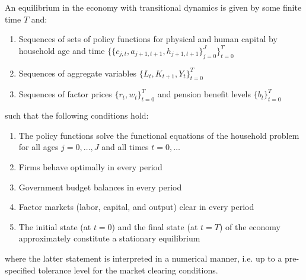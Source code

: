 An equilibrium in the economy with transitional dynamics is given by some finite time $T$ and:
\begin{enumerate}
    \item Sequences of sets of policy functions for physical and human capital by household age and time $\{ \{c_{j, t}, a_{j+1, t+1}, h_{j+1, t+1} \}_{j=0}^{J} \}_{t=0}^{T}$
    \item Sequences of aggregate variables $\{L_t, K_{t+1}, Y_t \}_{t=0}^{T}$
    \item Sequences of factor prices $\{r_t, w_t \}_{t=0}^{T}$ and pension benefit levels $\{b_t\}_{t=0}^{T}$
\end{enumerate}
such that the following conditions hold:
\begin{enumerate}
    \item The policy functions solve the functional equations of the household problem for all ages $j=0, \dots, J$ and all times $t=0, \dots$
    \item Firms behave optimally in every period
    \item Government budget balances in every period
    \item Factor markets (labor, capital, and output) clear in every period
    \item The initial state (at $t=0$) and the final state (at $t=T$) of the economy approximately constitute a stationary equilibrium
\end{enumerate}
where the latter statement is interpreted in a numerical manner, i.e. up to a pre-specified tolerance level for the market clearing conditions.